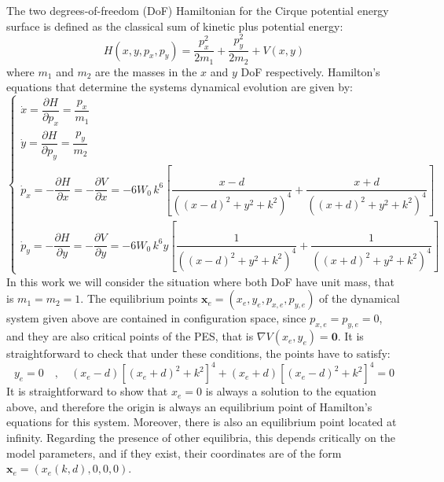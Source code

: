\documentclass[10pt,aps,onecolumn,superscriptaddress]{revtex4-2}
\begin{document}
The two degrees-of-freedom (DoF) Hamiltonian for the Cirque potential energy surface is defined as the classical sum of kinetic plus potential energy:
\begin{equation}
H(x,y,p_x,p_y) = \dfrac{p_x^2}{2 m_1} + \dfrac{p_y^2}{2 m_2} + V(x,y)
\label{eq:hamil}
\end{equation}
where $m_1$ and $m_2$ are the masses in the $x$ and $y$ DoF respectively. Hamilton's equations that determine the systems dynamical evolution are given by:
\begin{equation}
\begin{cases}
\dot{x} = \dfrac{\partial H}{\partial p_x} = \dfrac{p_x}{m_1} \\[.5cm]
\dot{y} = \dfrac{\partial H}{\partial p_y} = \dfrac{p_y}{m_2} \\
\dot{p}_x = - \dfrac{\partial H}{\partial x} = - \dfrac{\partial V}{\partial x} = - 6 W_0 \, k^6 \left[\dfrac{x - d}{\left(\left(x - d\right)^2 + y^2 + k^2\right)^4} + \dfrac{x + d}{\left(\left(x + d\right)^2 + y^2 + k^2\right)^4}\right] \\[.8cm]
\dot{p}_y = - \dfrac{\partial H}{\partial y} = - \dfrac{\partial V}{\partial y} = - 6 W_0 \, k^6 y \left[\dfrac{1}{\left(\left(x - d\right)^2 + y^2 + k^2\right)^4} + \dfrac{1}{\left(\left(x + d\right)^2 + y^2 + k^2\right)^4}\right]
\end{cases}
\label{eq:ham_eq}
\end{equation}
In this work we will consider the situation where both DoF have unit mass, that is $m_1 = m_2 = 1$. The equilibrium points $\mathbf{x}_e = (x_e,y_e,p_{x,e},p_{y,e})$ of the dynamical system given above are contained in configuration space, since $p_{x,e} = p_{y,e} = 0$, and they are also critical points of the PES, that is $\nabla V (x_e,y_e) = \mathbf{0}$. It is straightforward to check that under these conditions, the points have to satisfy:
\begin{equation}
y_e = 0 \quad , \quad \left(x_e - d\right) \left[\left(x_e + d\right)^2 + k^2\right]^4 + \left(x_e + d\right) \left[\left(x_e - d\right)^2 + k^2\right]^4 = 0 
\label{eq:eq_pts}
\end{equation}
It is straightforward to show that $x_e = 0$ is always a solution to the equation above, and therefore the origin is always an equilibrium point of Hamilton's equations for this system. Moreover, there is also an equilibrium point located at infinity. Regarding the presence of other equilibria, this depends critically on the model parameters, and if they exist, their coordinates are of the form $\mathbf{x}_e = (x_e(k,d),0,0,0)$. 
\end{document}
